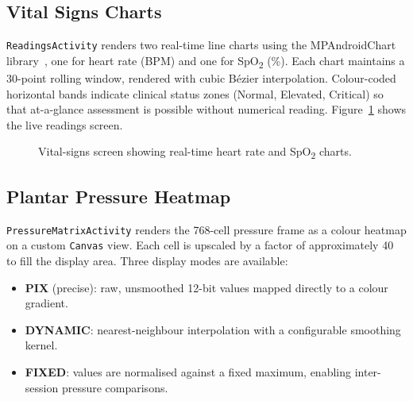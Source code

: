 \subsection{Vital Signs Charts}
\label{subsec:viz_vitals}

\texttt{ReadingsActivity} renders two real-time line charts using the MPAndroidChart
library~\cite{mpandroidchart}, one for heart rate (BPM) and one for SpO\textsubscript{2} (\%).
Each chart maintains a 30-point rolling window, rendered with cubic Bézier interpolation.
Colour-coded horizontal bands indicate clinical status zones (Normal, Elevated, Critical) so that
at-a-glance assessment is possible without numerical reading.  Figure~\ref{fig:viz_vitals} shows
the live readings screen.

\begin{figure}[htbp]
  \centering
  \caption{Vital-signs screen showing real-time heart rate and SpO\textsubscript{2} charts.}
  \label{fig:viz_vitals}
\end{figure}

\subsection{Plantar Pressure Heatmap}
\label{subsec:viz_pressure}

\texttt{PressureMatrixActivity} renders the 768-cell pressure frame as a colour heatmap on a
custom \texttt{Canvas} view.  Each cell is upscaled by a factor of approximately 40 to fill the
display area.  Three display modes are available:

\begin{itemize}[itemsep=2pt]
  \item \textbf{PIX} (precise): raw, unsmoothed 12-bit values mapped directly to a colour gradient.
  \item \textbf{DYNAMIC}: nearest-neighbour interpolation with a configurable smoothing kernel.
  \item \textbf{FIXED}: values are normalised against a fixed maximum, enabling inter-session
        pressure comparisons.
\end{itemize}

